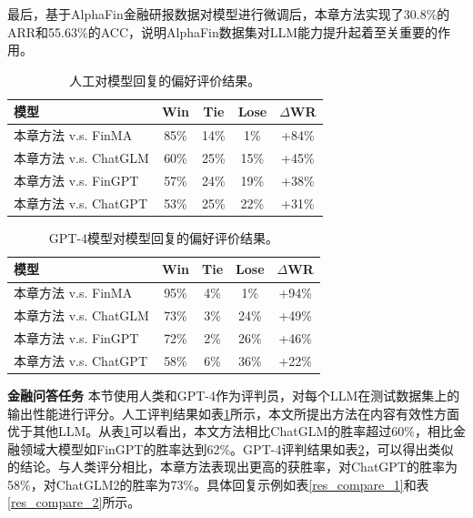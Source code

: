 最后，基于AlphaFin金融研报数据对模型进行微调后，本章方法实现了30.8\%的ARR和55.63\%的ACC，说明AlphaFin数据集对LLM能力提升起着至关重要的作用。

\begin{table}
	\caption{\label{human_pk_table}人工对模型回复的偏好评价结果。}
	\centering{}%
	\small 
	\begin{tabular}{lcccc}
		\toprule[2pt]
		模型 & Win & Tie & Lose & $\Delta$WR \\
		\hline
		本章方法 v.s. FinMA & 85\% & 14\% & 1\% & +84\% \\
		本章方法 v.s. ChatGLM & 60\% & 25\% & 15\% & +45\% \\
		本章方法 v.s. FinGPT & 57\% & 24\% & 19\% & +38\% \\
		本章方法 v.s. ChatGPT & 53\% & 25\% & 22\% & +31\% \\
		\bottomrule[2pt]
	\end{tabular}
\end{table}

\begin{table}
	\caption{\label{gpt_pk_table}GPT-4模型对模型回复的偏好评价结果。}
	\centering{}%
	\small 
	\begin{tabular}{lcccc}
		\toprule[2pt]
		模型 & Win & Tie & Lose & $\Delta$WR \\
		\hline
		本章方法 v.s. FinMA & 95\% & 4\% & 1\% & +94\% \\
		本章方法 v.s. ChatGLM & 73\% & 3\% & 24\% & +49\% \\
		本章方法 v.s. FinGPT & 72\% & 2\% & 26\% & +46\% \\
		本章方法 v.s. ChatGPT & 58\% & 6\% & 36\% & +22\% \\
		\bottomrule[2pt]
	\end{tabular}
\end{table}

\textbf{金融问答任务} 本节使用人类和GPT-4作为评判员，对每个LLM在测试数据集上的输出性能进行评分。人工评判结果如表\ref{human_pk_table}所示，本文所提出方法在内容有效性方面优于其他LLM。从表\ref{human_pk_table}可以看出，本文方法相比ChatGLM的胜率超过60\%，相比金融领域大模型如FinGPT的胜率达到62\%。GPT-4评判结果如表\ref{gpt_pk_table}，可以得出类似的结论。与人类评分相比，本章方法表现出更高的获胜率，对ChatGPT的胜率为58\%，对ChatGLM2的胜率为73\%。具体回复示例如表\ref{res_compare_1}和表\ref{res_compare_2}所示。

